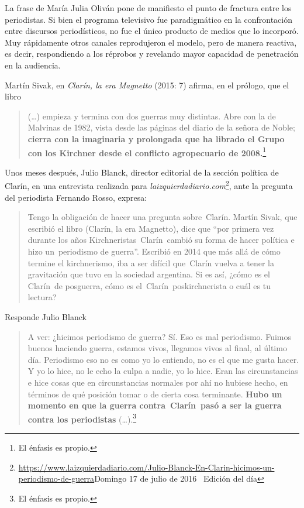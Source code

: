 La frase de María Julia Oliván pone de manifiesto el punto de fractura entre los periodistas. Si bien el programa televisivo fue paradigmático en la confrontación entre discursos periodísticos, no fue el único producto de medios que lo incorporó. Muy rápidamente otros canales reprodujeron el modelo, pero de manera reactiva, es decir, respondiendo a los réprobos y revelando mayor capacidad de penetración en la audiencia.

Martín Sivak, en \emph{Clarín, la era Magnetto} (2015: 7) afirma, en el prólogo, que el libro

\begin{quote}
(\ldots) empieza y termina con dos guerras muy distintas. Abre con la de Malvinas de 1982, vista desde las páginas del diario de la señora de Noble; \textbf{cierra con la imaginaria y prolongada que ha librado el Grupo con los Kirchner desde el conflicto agropecuario de 2008.}\footnote{El énfasis es propio.}
\end{quote}

Unos meses después, Julio Blanck, director editorial de la sección política de Clarín, en una entrevista realizada para \emph{laizquierdadiario.com}\footnote{\url{https://www.laizquierdadiario.com/Julio-Blanck-En-Clarin-hicimos-un-periodismo-de-guerra}Domingo 17 de julio de 2016~\textbar{} Edición del día}, ante la pregunta del periodista Fernando Rosso, expresa:

\begin{quote}
Tengo la obligación de hacer una pregunta sobre~Clarín. Martín Sivak, que escribió el libro (Clarín, la era Magnetto), dice que ``por primera vez durante los años Kirchneristas~Clarín~cambió su forma de hacer política e hizo un~periodismo de guerra''. Escribió en 2014 que más allá de cómo termine el kirchnerismo, iba a ser difícil que~Clarín vuelva a tener la gravitación que tuvo en la sociedad argentina. Si es así, ¿cómo es el Clarín~de posguerra, cómo es el~Clarín~poskirchnerista o cuál es tu lectura?
\end{quote}

Responde Julio Blanck

\begin{quote}
A ver: ¿hicimos periodismo de guerra? Sí. Eso es mal periodismo. Fuimos buenos haciendo guerra, estamos vivos, llegamos vivos al final, al último día. Periodismo eso no es como yo lo entiendo, no es el que me gusta hacer. Y yo lo hice, no le echo la culpa a nadie, yo lo hice. Eran las circunstancias e hice cosas que en circunstancias normales por ahí no hubiese hecho, en términos de qué posición tomar o de cierta cosa terminante. \textbf{Hubo un momento en que la guerra contra~Clarín~pasó a ser la guerra contra los periodistas} (\ldots).\footnote{El énfasis es propio.}
\end{quote}

